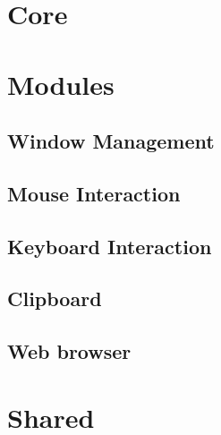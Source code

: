 \newcommand{\clsdiagram}{\paragraph{\textbf{Class diagram:\\}}}
\newcommand{\clsdsp}{\paragraph{\textbf{Description:\\}}}
\newcommand{\clsdcl}{\paragraph{\textbf{Declaration:\\}}}
\newcommand{\clscon}{\paragraph{\textbf{Constructor:\\}}}
\newcommand{\clsfield}{\paragraph{\textbf{Fields:\\}}}
\newcommand{\clsmethod}{\paragraph{\textbf{Methods:\\}}}

\newcommand{\dsp}[1]{Description: #1}   %
\section{Core}

\section{Modules}

\subsection{Window Management}
\subsection{Mouse Interaction}
\subsection{Keyboard Interaction}
\subsection{Clipboard}
\subsection{Web browser}

\section{Shared}
